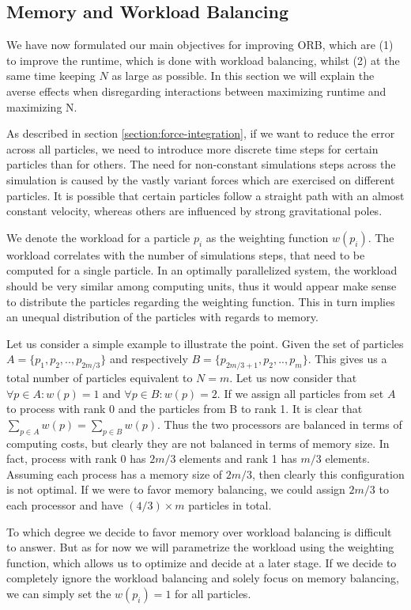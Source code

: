 \documentclass[]{article}
\begin{document}
\subsection{Memory and Workload Balancing}\label{balancing}
We have now formulated our main objectives for improving ORB, which are (1) to improve the runtime, which is done with workload balancing, whilst (2) at the same time keeping $N$ as large as possible. In this section we will explain the averse effects when disregarding interactions between maximizing runtime and maximizing N.


As described in section \ref{section:force-integration}, if we want to reduce the error across all particles, we need to introduce more discrete time steps for certain particles than for others. The need for non-constant simulations steps across the simulation is caused by the vastly variant forces which are exercised on different particles. It is possible that certain particles follow a straight path with an almost constant velocity, whereas others are influenced by strong gravitational poles. 

We denote the workload for a particle $p_i$ as the weighting function $w(p_i)$. The workload correlates with the number of simulations steps, that need to be computed for a single particle. In an optimally parallelized system, the workload should be very similar among computing units, thus it would appear make sense to distribute the particles regarding the weighting function. This in turn implies an unequal distribution of the particles with regards to memory.

Let us consider a simple example to illustrate the point. Given the set of particles $A = \{p_1, p_2, .., p_{2m/3}\}$ and respectively $B = \{p_{2m/3 + 1}, p_2, .., p_{m}\}$. This gives us a total number of particles equivalent to $N = m$. Let us now consider that $\forall p \in A : w(p) = 1$ and $\forall p \in B : w(p) = 2$. If we assign all particles from set $A$ to process with rank 0 and the particles from B to rank 1. It is clear that $\sum_{p\in A} w(p) = \sum_{p\in B} w(p)$. Thus the two processors are balanced in terms of computing costs, but clearly they are not balanced in terms of memory size. In fact, process with rank 0 has $2m/3$ elements and rank 1 has $m/3$ elements. Assuming each process has a memory size of $2m/3$, then clearly this configuration is not optimal. If we were to favor memory balancing, we could assign $2m/3$ to each processor and have $(4/3) \times m$ particles in total. 

To which degree we decide to favor memory over workload balancing is difficult to answer. But as for now we will parametrize the workload using the weighting function, which allows us to optimize and decide at a later stage. If we decide to completely ignore the workload balancing and solely focus on memory balancing, we can simply set the $w(p_i) = 1$ for all particles.
\end{document}
